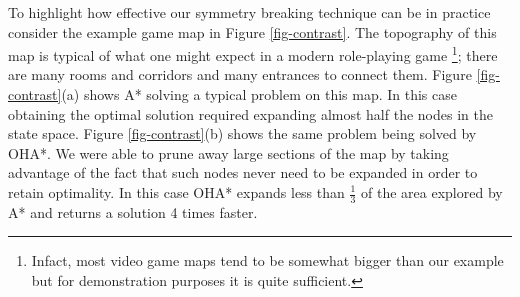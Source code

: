 To highlight how effective our symmetry breaking technique can be in practice consider the example game map
in Figure \ref{fig-contrast}. 
The topography of this map is typical of what one might expect in a modern role-playing game
\footnote{Infact, most video game maps tend to be somewhat bigger than our example but for demonstration 
purposes it is quite sufficient.};
there are many rooms and corridors and many entrances to connect them.
Figure \ref{fig-contrast}(a) shows A* solving a typical problem on this map. 
In this case obtaining the optimal solution required expanding almost half the nodes in the state space.
Figure \ref{fig-contrast}(b) shows the same problem being solved by OHA*.
We were able to prune away large sections of the map by taking advantage of the fact that
such nodes never need to be expanded in order to retain optimality.
In this case OHA* expands less than $\frac{1}{3}$ of the area explored by A* and returns
a solution 4 times faster.

